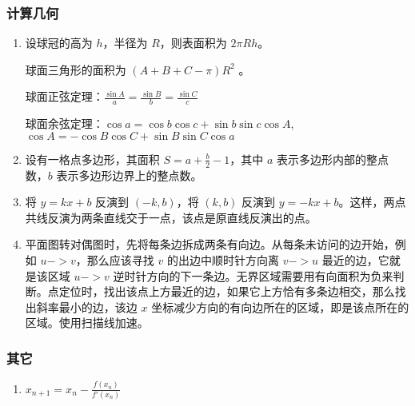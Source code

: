 \subsubsection{计算几何}

\begin{enumerate}

\item 设球冠的高为 $h$，半径为 $R$，则表面积为 $2\pi Rh$。

球面三角形的面积为 $(A+B+C-\pi)R^{2}$ 。

球面正弦定理：$\frac{\sin A}{a} = \frac{\sin B}{b} = \frac{\sin C}{c}$

球面余弦定理：$\cos a=\cos b\cos c+\sin b\sin c\cos A$, $\cos A=-\cos B\cos C+\sin B\sin C\cos a$

\item 设有一格点多边形，其面积 $S=a+\frac{b}{2}-1$，其中 $a$ 表示多边形内部的整点数，$b$ 表示多边形边界上的整点数。

\item 将 $y=kx+b$ 反演到 $(-k,b)$，将 $(k,b)$ 反演到 $y=-kx+b$。这样，两点共线反演为两条直线交于一点，该点是原直线反演出的点。

\item 平面图转对偶图时，先将每条边拆成两条有向边。从每条未访问的边开始，例如 $u->v$，那么应该寻找 $v$ 的出边中顺时针方向离 $v->u$ 最近的边，它就是该区域 $u->v$ 逆时针方向的下一条边。无界区域需要用有向面积为负来判断。点定位时，找出该点上方最近的边，如果它上方恰有多条边相交，那么找出斜率最小的边，该边 $x$ 坐标减少方向的有向边所在的区域，即是该点所在的区域。使用扫描线加速。

\end{enumerate}

\subsubsection{其它}

\begin{enumerate}

\item $x_{n+1}=x_{n}-\frac{f(x_{n})}{f'(x_{n})}$

\end{enumerate}
